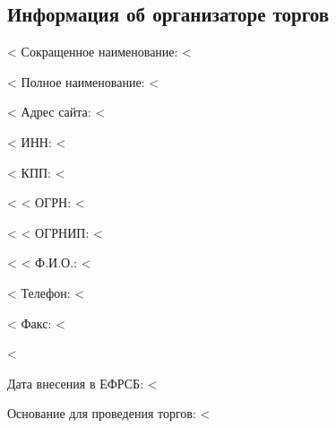 \documentclass[a4paper,12pt]{article}
\begin{document}
{{{{{{{	\subsection*{Информация об организаторе торгов}
        <%
            {\color{Gray} Сокращенное наименование:} <%
            \par
        <%
        {\color{Gray} Полное наименование:} <%
        \par
        <%
            {\color{Gray} Адрес сайта:} <%
        	\par
        <%
        {\color{Gray} ИНН:} <%
        \par
        <%
            {\color{Gray} КПП:} <%
        	\par
        <%
        <%
            {\color{Gray} ОГРН:} <%
        	\par
        <%
        <%
            {\color{Gray} ОГРНИП:} <%
        	\par
        <%
        <%
            {\color{Gray} Ф.И.О.:} <%
        	\par
        <%
        {\color{Gray} Телефон:} <%
    	\par
        <%
            {\color{Gray} Факс:} <%
        	\par
        <%

    {\color{Gray} Дата внесения в ЕФРСБ:} <%
    \par
    {\color{Gray} Основание для проведения торгов:} <%

}}}}}}}
\end{document}
